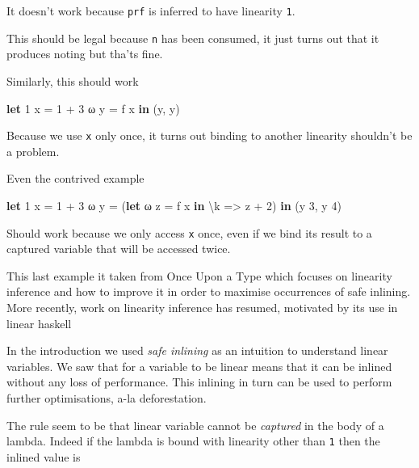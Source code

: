 \documentclass[
]{article}
\newenvironment{Shaded}{}{}
\newcommand{\DecValTok}[1]{\textcolor[rgb]{0.25,0.63,0.44}{#1}}
\newcommand{\KeywordTok}[1]{\textcolor[rgb]{0.00,0.44,0.13}{\textbf{#1}}}
\newcommand{\NormalTok}[1]{#1}
\newcommand{\OperatorTok}[1]{\textcolor[rgb]{0.40,0.40,0.40}{#1}}
\newcommand{\OtherTok}[1]{\textcolor[rgb]{0.00,0.44,0.13}{#1}}
\begin{document}
It doesn't work because \texttt{prf} is inferred to have linearity
\texttt{1}.

This should be legal because \texttt{n} has been consumed, it just turns
out that it produces noting but tha'ts fine.

Similarly, this should work

\begin{Shaded}
\begin{Highlighting}[]
\KeywordTok{let} \DecValTok{1}\NormalTok{ x }\OtherTok{=} \DecValTok{1} \OperatorTok{+} \DecValTok{3}
\NormalTok{    ω y }\OtherTok{=}\NormalTok{ f x }\KeywordTok{in}
\NormalTok{    (y, y)}
\end{Highlighting}
\end{Shaded}

Because we use \texttt{x} only once, it turns out binding to another
linearity shouldn't be a problem.

Even the contrived example

\begin{Shaded}
\begin{Highlighting}[]
\KeywordTok{let} \DecValTok{1}\NormalTok{ x }\OtherTok{=} \DecValTok{1} \OperatorTok{+} \DecValTok{3}
\NormalTok{    ω y }\OtherTok{=}\NormalTok{ (}\KeywordTok{let}\NormalTok{ ω z }\OtherTok{=}\NormalTok{ f x }\KeywordTok{in}\NormalTok{ \textbackslash{}k }\OtherTok{=\textgreater{}}\NormalTok{ z }\OperatorTok{+} \DecValTok{2}\NormalTok{) }\KeywordTok{in}
\NormalTok{    (y }\DecValTok{3}\NormalTok{, y }\DecValTok{4}\NormalTok{)}
\end{Highlighting}
\end{Shaded}

Should work because we only access \texttt{x} once, even if we bind its
result to a captured variable that will be accessed twice.

This last example it taken from Once Upon a Type which focuses on
linearity inference and how to improve it in order to maximise
occurrences of safe inlining. More recently, work on linearity
inference\cite{linear_inference} has resumed, motivated by its use in
linear haskell \cite{linear_haskell}

In the introduction we used \emph{safe inlining} as an intuition to
understand linear variables. We saw that for a variable to be linear
means that it can be inlined without any loss of performance. This
inlining in turn can be used to perform further optimisations, a-la
deforestation.

The rule seem to be that linear variable cannot be \emph{captured} in
the body of a lambda. Indeed if the lambda is bound with linearity other
than \texttt{1} then the inlined value is
\end{document}
